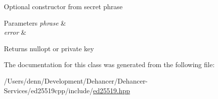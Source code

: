 Optional constructor from secret phrase 
\begin{DoxyParams}{Parameters}
{\em phrase} & \\
\hline
{\em error} & \\
\hline
\end{DoxyParams}
\begin{DoxyReturn}{Returns}
nullopt or private key 
\end{DoxyReturn}


The documentation for this class was generated from the following file\+:\begin{DoxyCompactItemize}
\item 
/\+Users/denn/\+Development/\+Dehancer/\+Dehancer-\/\+Services/ed25519cpp/include/\mbox{\hyperlink{ed25519_8hpp}{ed25519.\+hpp}}\end{DoxyCompactItemize}
